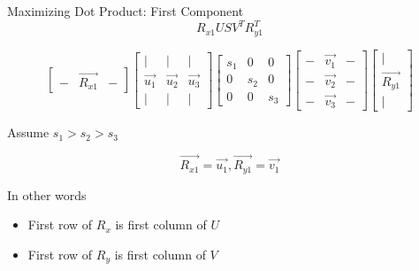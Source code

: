 \documentclass{beamer}
\begin{document}
\begin{frame}{Maximizing Dot Product: First Component}
\[ R_{x1} U S V^T R_{y1}^T \]

\small
\[ \left[ \begin{array}{ccc} - & \vec{R_{x1}} & - \end{array} \right] \left[ \begin{array}{ccc} | & | & | \\ \vec{u_1} & \vec{u_2} & \vec{u_3} \\ | & | & | \end{array} \right]  \left[ \begin{array}{ccc} s_1 & 0 & 0 \\ 0 & s_2 & 0 \\ 0 & 0 & s_3 \end{array} \right] \left[ \begin{array}{ccc} - & \vec{v_1} & - \\ - & \vec{v_2} & - \\ - & \vec{v_3} & - \end{array} \right] \left[ \begin{array}{c} | \\ \vec{R_{y1}} \\ | \end{array} \right] \]

Assume $s_1 > s_2 > s_3$

\[ \vec{R_{x1}} = \vec{u_1}, \vec{R_{y1}} = \vec{v_1} \]

In other words

\begin{itemize}[label=$\vartriangleright$]
\item First row of $R_x$ is first column of $U$
\item First row of $R_y$ is first column of $V$
\end{itemize}

\end{frame}
\end{document}
